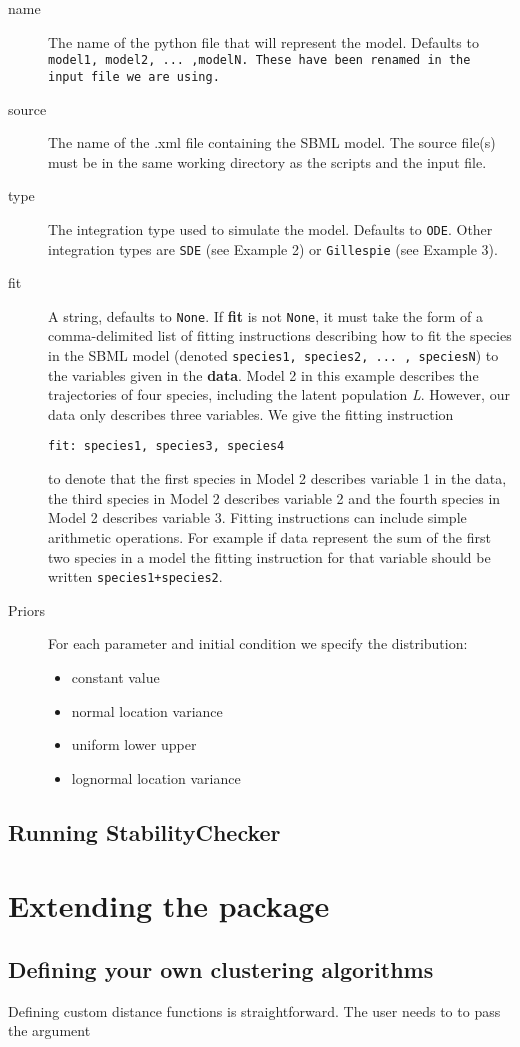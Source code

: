 \documentclass[a4paper]{report}
\begin{document}
\begin{description}
\item[name] The name of the python file that will represent the model. Defaults to \tt model1\rm, \tt model2\rm, ... ,\tt modelN\rm.  These have been renamed in the input file we are using.
\item[source] The name of the .xml file containing the SBML model. The source file(s) must be in the same working directory as the scripts and the input file.
\item[type] The integration type used to simulate the model. Defaults to \verb$ODE$. Other integration types are \verb$SDE$ (see Example 2) or \verb$Gillespie$ (see Example 3).
\item[fit] A string, defaults to \verb$None$. If \textbf{fit} is not \verb$None$, it must take the form of a comma-delimited list of fitting instructions describing how to fit the species in the SBML model (denoted \verb$species1, species2, ... , speciesN$) to the variables given in the \textbf{data}. Model 2 in this example describes the trajectories of four species, including the latent population \emph{L}. However, our data only describes three variables.  We give the fitting instruction
\begin{verbatim}
fit: species1, species3, species4
\end{verbatim}
to denote that the first species in Model 2 describes variable 1 in the data, the third species in Model 2 describes variable 2 and the fourth species in Model 2 describes variable 3. Fitting instructions can include simple arithmetic operations. For example if data represent the sum of the first two species in a model the fitting instruction for that variable should be written \verb$species1+species2$. 
 \item[Priors] For each parameter and initial condition we specify the distribution:
\begin{itemize}
\item constant  value
\item normal location variance
\item uniform lower upper
\item lognormal location variance
\end{itemize}
\end{description}

\subsection{Running StabilityChecker}

\newpage


\section{Extending the package}
\label{extending}
\subsection{Defining your own clustering algorithms}
Defining custom distance functions is straightforward. The user needs to to pass the argument 
\end{document}
